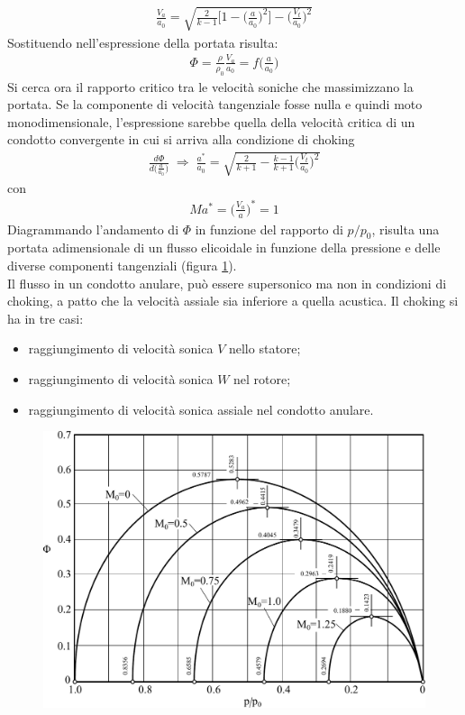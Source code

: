\begin{align*}
\frac{V_a}{a_0} = \sqrt{\frac{2}{k-1} \bigg[ 1- \bigg( \frac{a}{a_0} \bigg)^2 \bigg] - \bigg( \frac{V_t}{a_0} \bigg)^2}
\end{align*}
Sostituendo nell'espressione della portata risulta:
\begin{align*}
\Phi = \frac{\rho}{\rho_0} \frac{V_a}{a_0} = f \bigg( \frac{a}{a_0} \bigg)
\end{align*}
Si cerca ora il rapporto critico tra le velocità soniche che massimizzano la portata. Se la componente di velocità tangenziale fosse nulla e quindi moto monodimensionale, l'espressione sarebbe quella della velocità critica di un condotto convergente in cui si arriva alla condizione di choking
\begin{align*}
\frac{d\Phi}{d \bigg( \frac{a}{a_0} \bigg)} \; \Rightarrow \; \boxed{ \frac{a^*}{a_0} = \sqrt{\frac{2}{k+1} - \frac{k-1}{k+1} \bigg( \frac{V_t}{a_0} \bigg)^2} }
\end{align*}
con
\begin{align*}
Ma^* = \bigg( \frac{V_a}{a} \bigg)^* = 1
\end{align*}
Diagrammando l'andamento di $\Phi$ in funzione del rapporto di $p/p_0$, risulta una portata adimensionale di un flusso elicoidale in funzione della pressione e delle diverse componenti tangenziali (figura \ref{fd:PortCondAn}).\\
Il flusso in un condotto anulare, può essere supersonico ma non in condizioni di choking, a patto che la velocità assiale sia inferiore a quella acustica. Il choking si ha in tre casi:
\begin{itemize}
\item raggiungimento di velocità sonica $V$ nello statore;
\item raggiungimento di velocità sonica $W$ nel rotore;
\item raggiungimento di velocità sonica assiale nel condotto anulare.
\end{itemize}
\begin{figure}
\centering
  \includegraphics[width=.7\textwidth]{fig/PortCondAn.pdf}
\caption{}
\label{fd:PortCondAn}
\end{figure}
